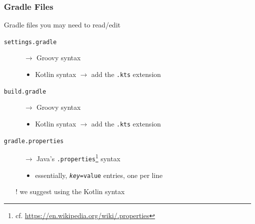 \documentclass[presentation]{beamer}\mode<presentation>{\usetheme{AMSBolognaFC}}
\begin{document}
\begin{frame}[allowframebreaks]
\frametitle{Gradle Files}

\begin{block}{Gradle files you may need to read/edit}
    \begin{description}
        \item[\texttt{settings.gradle}] $\rightarrow$ Groovy syntax
        \begin{itemize}
            \item Kotlin syntax $\rightarrow$ add the \alert{\texttt{.kts}} extension
        \end{itemize}

        \item[\texttt{build.gradle}] $\rightarrow$ Groovy syntax
        \begin{itemize}
            \item Kotlin syntax $\rightarrow$ add the \alert{\texttt{.kts}} extension
        \end{itemize}

        \item[\texttt{gradle.properties}] $\rightarrow$ Java's \texttt{.properties}\footnote{cf. \url{https://en.wikipedia.org/wiki/.properties}} syntax
        \begin{itemize}
            \item essentially, \texttt{\textit{key}\alert{=}value} entries, one per line
        \end{itemize}
    \end{description}
\end{block}
%
\begin{itemize}
    \item[!] we suggest using the Kotlin syntax
\end{itemize}



\framebreak



\framebreak



\end{frame}
\end{document}
